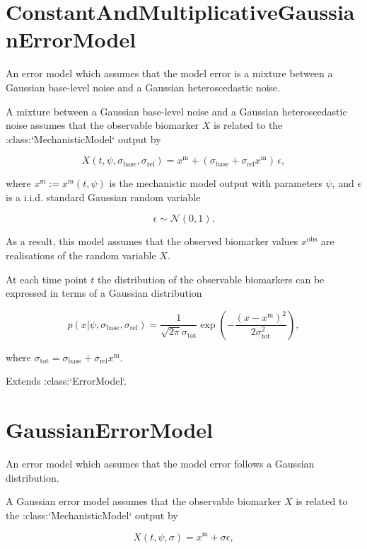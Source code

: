 \documentclass{article}
\begin{document}
\section{ConstantAndMultiplicativeGaussianErrorModel}
    An error model which assumes that the model error is a mixture between a
    Gaussian base-level noise and a Gaussian heteroscedastic noise.

    A mixture between a Gaussian base-level noise and a Gaussian
    heteroscedastic noise assumes that the observable biomarker $X$
    is related to the :class:`MechanisticModel` output by

    $$
        X(t, \psi , \sigma _{\text{base}}, \sigma _{\text{rel}}) =
        x^{\text{m}} + \left( \sigma _{\text{base}} + \sigma _{\text{rel}}
        x^{\text{m}}\right) \, \epsilon ,
    $$

    where $x^{\text{m}} := x^{\text{m}}(t, \psi )$ is the mechanistic
    model output with parameters $\psi$, and $\epsilon$ is a
    i.i.d. standard Gaussian random variable

    $$
        \epsilon \sim \mathcal{N}(0, 1).
    $$

    As a result, this model assumes that the observed biomarker values
    $x^{\text{obs}}$ are realisations of the random variable
    $X$.

    At each time point $t$ the distribution of the observable biomarkers
    can be expressed in terms of a Gaussian distribution

    $$
        p(x | \psi , \sigma _{\text{base}}, \sigma _{\text{rel}}) =
        \frac{1}{\sqrt{2\pi} \sigma _{\text{tot}}}
        \exp{\left(-\frac{\left(x-x^{\text{m}}\right) ^2}
        {2\sigma^2 _{\text{tot}}} \right)},
    $$

    where $\sigma _{\text{tot}} = \sigma _{\text{base}} +
    \sigma _{\text{rel}}x^{\text{m}}$.

    Extends :class:`ErrorModel`.


\section{GaussianErrorModel}
    An error model which assumes that the model error follows a Gaussian
    distribution.

    A Gaussian error model assumes that the observable
    biomarker $X$ is related to the :class:`MechanisticModel`
    output by

    $$
        X(t, \psi , \sigma) = x^{\text{m}} + \sigma \epsilon ,
    $$
\end{document}
